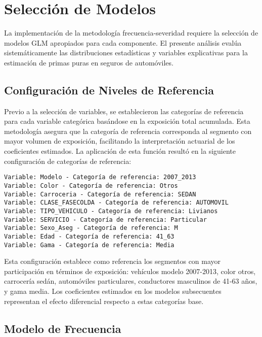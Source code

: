 \section{Selección de Modelos}

La implementación de la metodología frecuencia-severidad requiere la selección de modelos GLM apropiados para cada componente. El presente análisis evalúa sistemáticamente las distribuciones estadísticas y variables explicativas para la estimación de primas puras en seguros de automóviles.

\subsection{Configuración de Niveles de Referencia}

Previo a la selección de variables, se establecieron las categorías de referencia para cada variable categórica basándose en la exposición total acumulada. Esta metodología asegura que la categoría de referencia corresponda al segmento con mayor volumen de exposición, facilitando la interpretación actuarial de los coeficientes estimados. La aplicación de esta función resultó en la siguiente configuración de categorías de referencia:

\begin{lstlisting}[style=Routput]
Variable: Modelo - Categoría de referencia: 2007_2013 
Variable: Color - Categoría de referencia: Otros 
Variable: Carroceria - Categoría de referencia: SEDAN 
Variable: CLASE_FASECOLDA - Categoría de referencia: AUTOMOVIL 
Variable: TIPO_VEHICULO - Categoría de referencia: Livianos 
Variable: SERVICIO - Categoría de referencia: Particular 
Variable: Sexo_Aseg - Categoría de referencia: M 
Variable: Edad - Categoría de referencia: 41_63 
Variable: Gama - Categoría de referencia: Media
\end{lstlisting}

Esta configuración establece como referencia los segmentos con mayor participación en términos de exposición: vehículos modelo 2007-2013, color otros, carrocería sedán, automóviles particulares, conductores masculinos de 41-63 años, y gama media. Los coeficientes estimados en los modelos subsecuentes representan el efecto diferencial respecto a estas categorías base.

\subsection{Modelo de Frecuencia}

